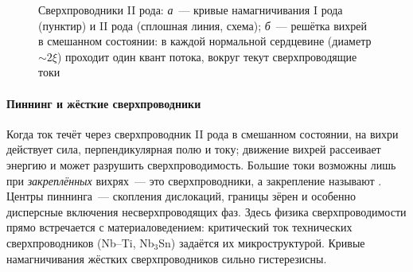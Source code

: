 \begin{figure}[ht]
\centering
\begin{subfigure}[b]{0.48\textwidth}\centering
{}
\caption{}
\end{subfigure}\hfill
\begin{subfigure}[b]{0.48\textwidth}\centering
{}
\caption{}
\end{subfigure}
\caption{Сверхпроводники II рода: \textit{а}~— кривые намагничивания I
рода (пунктир) и II рода (сплошная линия, схема); \textit{б}~— решётка
вихрей в смешанном состоянии: в каждой нормальной сердцевине (диаметр
$\sim2\xi$) проходит один квант потока, вокруг текут
сверхпроводящие токи}
\label{fig:sc-types}
\end{figure}

\paragraph{Пиннинг и жёсткие сверхпроводники}
Когда ток течёт через сверхпроводник II рода в смешанном состоянии, на
вихри действует сила, перпендикулярная полю и току; движение вихрей
рассеивает энергию и может разрушить сверхпроводимость. Большие токи
возможны лишь при \emph{закреплённых} вихрях~— это 
сверхпроводники, а закрепление называют . Центры
пиннинга~— скопления дислокаций, границы зёрен и особенно дисперсные
включения несверхпроводящих фаз. Здесь физика сверхпроводимости прямо
встречается с материаловедением: критический ток технических
сверхпроводников (Nb--Ti, Nb$_3$Sn) задаётся их микроструктурой. Кривые
намагничивания жёстких сверхпроводников сильно гистерезисны.

